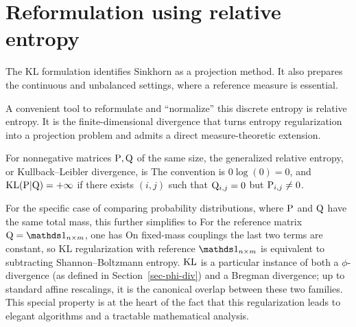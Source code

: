 \section{Reformulation using relative entropy}

The KL formulation identifies Sinkhorn as a projection method. It also prepares the continuous and unbalanced settings, where a reference measure is essential.

A convenient tool to reformulate and ``normalize'' this discrete entropy is relative entropy. It is the finite-dimensional divergence that turns entropy regularization into a projection problem and admits a direct measure-theoretic extension.

\begin{defn}\label{def-discrete-relative-entropy}
	For nonnegative matrices $\P,\Q$ of the same size, the generalized relative entropy, or Kullback--Leibler divergence, is
	The convention is $0\log(0)=0$, and $\KLD(\P|\Q)=+\infty$ if there exists $(i,j)$ such that $\Q_{i,j}=0$ but $\P_{i,j} \neq 0$.
\end{defn}
For the specific case of comparing probability distributions, where $\P$ and $\Q$ have the same total mass, this further simplifies to
For the reference matrix $\Q=\ones_{n \times m}$, one has
On fixed-mass couplings the last two terms are constant, so KL regularization with reference $\ones_{n\times m}$ is equivalent to subtracting Shannon--Boltzmann entropy.
$\KLD$ is a particular instance of both a $\phi$-divergence (as defined in Section~\ref{sec-phi-div}) and a Bregman divergence; up to standard affine rescalings, it is the canonical overlap between these two families. This special property is at the heart of the fact that this regularization leads to elegant algorithms and a tractable mathematical analysis.

